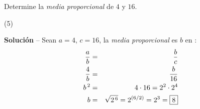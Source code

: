 \item{Determine la \textit{media proporcional} de $4$ y $16$.
	\begin{tasks}(5)
	\end{tasks}
	\noindent \textbf{Solución} -- {\small Sean $a = 4$, $c = 16$, la \textit{media proporcional} es $b$ en} :
	\begin{eqnarray*}
		\dfrac{a}{b} &=& \dfrac{b}{c} \\
		\dfrac{4}{b} &=& \dfrac{b}{16} \\
		b^{\,2} &=& 4 \cdot 16 = 2^2 \cdot 2^4 \\
		b &=& \sqrt{2^{\,6}} = 2^{(6/2)} = 2^3 =\fbox{8} 
	\end{eqnarray*}
}
